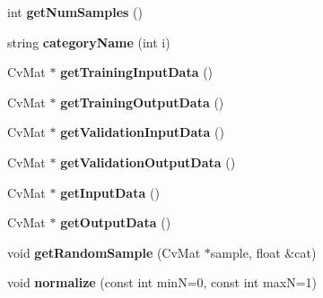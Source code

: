 \begin{DoxyCompactItemize}
\item 
\hypertarget{class_m_l_data_aac7550c01b65a1c5d8ed507747a04a8b}{int {\bfseries get\-Num\-Samples} ()}\label{class_m_l_data_aac7550c01b65a1c5d8ed507747a04a8b}

\item 
\hypertarget{class_m_l_data_a31914b82de776f902052f1213efa896b}{string {\bfseries category\-Name} (int i)}\label{class_m_l_data_a31914b82de776f902052f1213efa896b}

\item 
\hypertarget{class_m_l_data_a754c95921bd09a16f8583d7eaf72ea6c}{Cv\-Mat $\ast$ {\bfseries get\-Training\-Input\-Data} ()}\label{class_m_l_data_a754c95921bd09a16f8583d7eaf72ea6c}

\item 
\hypertarget{class_m_l_data_a882c385f5b7efff3a2d85de2914fec86}{Cv\-Mat $\ast$ {\bfseries get\-Training\-Output\-Data} ()}\label{class_m_l_data_a882c385f5b7efff3a2d85de2914fec86}

\item 
\hypertarget{class_m_l_data_a98bc64f06b1ad1341e8662967ea5c94d}{Cv\-Mat $\ast$ {\bfseries get\-Validation\-Input\-Data} ()}\label{class_m_l_data_a98bc64f06b1ad1341e8662967ea5c94d}

\item 
\hypertarget{class_m_l_data_a3048e927989b16bd8e8d02fe8a2515fb}{Cv\-Mat $\ast$ {\bfseries get\-Validation\-Output\-Data} ()}\label{class_m_l_data_a3048e927989b16bd8e8d02fe8a2515fb}

\item 
\hypertarget{class_m_l_data_a787d53de79ee63d2b3e9093aca02240b}{Cv\-Mat $\ast$ {\bfseries get\-Input\-Data} ()}\label{class_m_l_data_a787d53de79ee63d2b3e9093aca02240b}

\item 
\hypertarget{class_m_l_data_a32df894be857548ce30aac4703050a32}{Cv\-Mat $\ast$ {\bfseries get\-Output\-Data} ()}\label{class_m_l_data_a32df894be857548ce30aac4703050a32}

\item 
\hypertarget{class_m_l_data_ae2b83af78f54a4304db5514516e5e691}{void {\bfseries get\-Random\-Sample} (Cv\-Mat $\ast$sample, float \&cat)}\label{class_m_l_data_ae2b83af78f54a4304db5514516e5e691}

\item 
\hypertarget{class_m_l_data_a0dbafa975f61f0c22ff91aa61a76c776}{void {\bfseries normalize} (const int min\-N=0, const int max\-N=1)}\label{class_m_l_data_a0dbafa975f61f0c22ff91aa61a76c776}

\end{DoxyCompactItemize}
